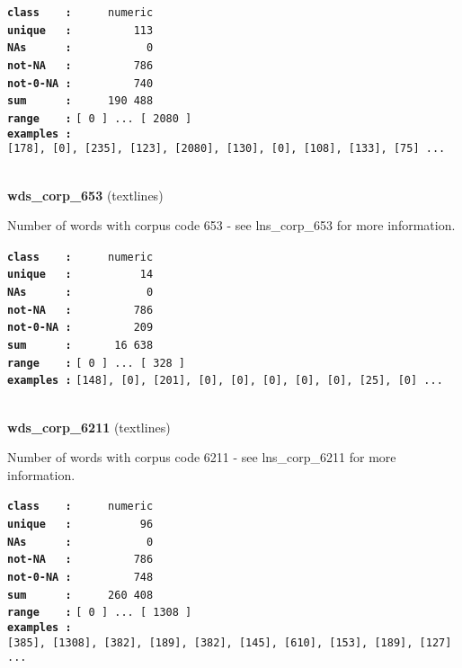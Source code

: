 \documentclass[]{article}
\begin{document}
\textbf{\texttt{class\ \ \ \ :}} \texttt{~~~~~numeric}\\
\textbf{\texttt{unique\ \ \ :}} \texttt{~~~~~~~~~113}\\
\textbf{\texttt{NAs\ \ \ \ \ \ :}} \texttt{~~~~~~~~~~~0}\\
\textbf{\texttt{not-NA\ \ \ :}} \texttt{~~~~~~~~~786}\\
\textbf{\texttt{not-0-NA\ :}} \texttt{~~~~~~~~~740}\\
\textbf{\texttt{sum\ \ \ \ \ \ :}} \texttt{~~~~~190~488}\\
\textbf{\texttt{range\ \ \ \ :}}
\texttt{{[}\ 0\ {]}\ ...\ {[}\ 2080\ {]}}\\
\textbf{\texttt{examples\ :}}
\texttt{{[}178{]},\ {[}0{]},\ {[}235{]},\ {[}123{]},\ {[}2080{]},\ {[}130{]},\ {[}0{]},\ {[}108{]},\ {[}133{]},\ {[}75{]}\ ...}\\

~

\textbf{wds\_corp\_653} (textlines)

Number of words with corpus code 653 - see lns\_corp\_653 for more
information.

\textbf{\texttt{class\ \ \ \ :}} \texttt{~~~~~numeric}\\
\textbf{\texttt{unique\ \ \ :}} \texttt{~~~~~~~~~~14}\\
\textbf{\texttt{NAs\ \ \ \ \ \ :}} \texttt{~~~~~~~~~~~0}\\
\textbf{\texttt{not-NA\ \ \ :}} \texttt{~~~~~~~~~786}\\
\textbf{\texttt{not-0-NA\ :}} \texttt{~~~~~~~~~209}\\
\textbf{\texttt{sum\ \ \ \ \ \ :}} \texttt{~~~~~~16~638}\\
\textbf{\texttt{range\ \ \ \ :}}
\texttt{{[}\ 0\ {]}\ ...\ {[}\ 328\ {]}}\\
\textbf{\texttt{examples\ :}}
\texttt{{[}148{]},\ {[}0{]},\ {[}201{]},\ {[}0{]},\ {[}0{]},\ {[}0{]},\ {[}0{]},\ {[}0{]},\ {[}25{]},\ {[}0{]}\ ...}\\

~

\textbf{wds\_corp\_6211} (textlines)

Number of words with corpus code 6211 - see lns\_corp\_6211 for more
information.

\textbf{\texttt{class\ \ \ \ :}} \texttt{~~~~~numeric}\\
\textbf{\texttt{unique\ \ \ :}} \texttt{~~~~~~~~~~96}\\
\textbf{\texttt{NAs\ \ \ \ \ \ :}} \texttt{~~~~~~~~~~~0}\\
\textbf{\texttt{not-NA\ \ \ :}} \texttt{~~~~~~~~~786}\\
\textbf{\texttt{not-0-NA\ :}} \texttt{~~~~~~~~~748}\\
\textbf{\texttt{sum\ \ \ \ \ \ :}} \texttt{~~~~~260~408}\\
\textbf{\texttt{range\ \ \ \ :}}
\texttt{{[}\ 0\ {]}\ ...\ {[}\ 1308\ {]}}\\
\textbf{\texttt{examples\ :}}
\texttt{{[}385{]},\ {[}1308{]},\ {[}382{]},\ {[}189{]},\ {[}382{]},\ {[}145{]},\ {[}610{]},\ {[}153{]},\ {[}189{]},\ {[}127{]}\ ...}\\
\end{document}
